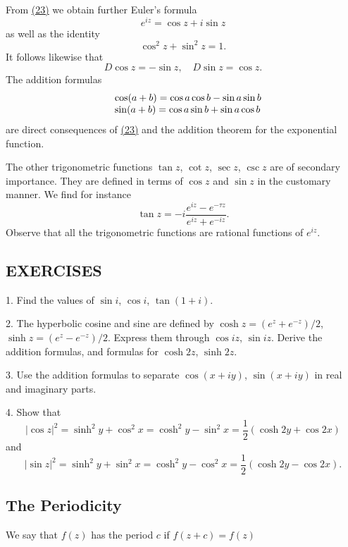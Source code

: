From \hyperref[eq:2.23]{(23)} we obtain further Euler's formula
\begin{equation*}
e ^ {i z} = \cos z + i \sin z
\end{equation*}
as well as the identity
\begin{equation*}
\cos^ {2} z + \sin^ {2} z = 1.
\end{equation*}
It follows likewise that
\begin{equation*}
D \cos z = - \sin z, \quad D \sin z = \cos z.
\end{equation*}
The addition formulas
\begin{equation*}
\begin{array}{r l} & {\cos (a + b) = \cos a \cos b - \sin a \sin b} \\ & {\sin (a + b) = \cos a \sin b + \sin a \cos b} \end{array}
\end{equation*}
are direct consequences of \hyperref[eq:2.23]{(23)} and the addition theorem for the exponential function.

The other trigonometric functions $\tan z$, $\cot z$, $\sec z$, $\csc z$ are of secondary importance. They are defined in terms of $\cos z$ and $\sin z$ in the customary manner. We find for instance
\begin{equation*}
\tan z = - i \frac {e ^ {i z} - e ^ {- \tau z}}{e ^ {i z} + e ^ {- i z}}.
\end{equation*}
Observe that all the trigonometric functions are rational functions of $e^{iz}$.

\subsection*{EXERCISES}
1. Find the values of $\sin i$, $\cos i$, $\tan(1+i)$.

2. The hyperbolic cosine and sine are defined by $\cosh z = (e^{z} + e^{-z})/2$, $\sinh z = (e^{z} - e^{-z})/2$. Express them through $\cos iz$, $\sin iz$. Derive the addition formulas, and formulas for $\cosh 2z$, $\sinh 2z$.

3. Use the addition formulas to separate $\cos(x + iy)$, $\sin(x + iy)$ in real and imaginary parts.

4. Show that
\begin{equation*}
| \cos z | ^ {2} = \sinh^ {2} y + \cos^ {2} x = \cosh^ {2} y - \sin^ {2} x = \frac {1}{2} (\cosh 2 y + \cos 2 x)
\end{equation*}
and
\begin{equation*}
| \sin z | ^ {2} = \sinh^ {2} y + \sin^ {2} x = \cosh^ {2} y - \cos^ {2} x = \frac {1}{2} (\cosh 2 y - \cos 2 x).
\end{equation*}
\setcounter{section}{3}\setcounter{subsection}{2}\subsection{The Periodicity}\label{sec:2.3.3}
We say that $f(z)$ has the period $c$ if $f(z + c) = f(z)$


